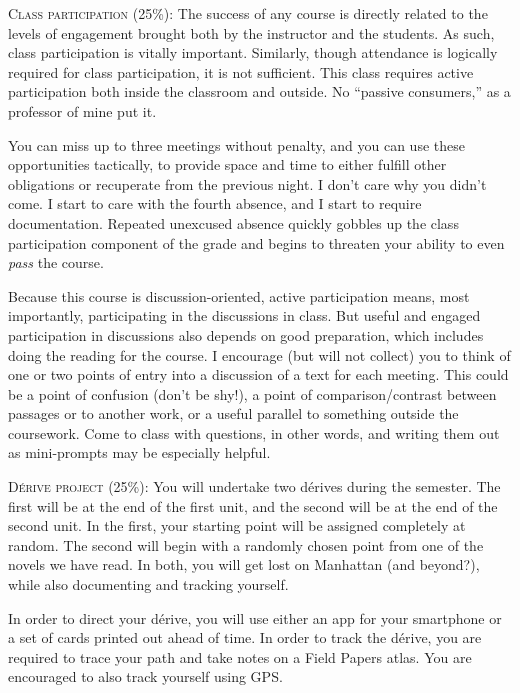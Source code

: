 \begin{description}

  \item \textsc{Class participation (25\%):} The success of any course is
    directly related to the levels of engagement brought both by the instructor
    and the students. As such, class participation is vitally important.
    Similarly, though attendance is logically required for class participation,
    it is not sufficient. This class requires active participation both inside
    the classroom and outside. No “passive consumers,” as a professor of mine
    put it. 
    
    You can miss up to three meetings without penalty, and you can use these
    opportunities tactically, to provide space and time to either fulfill
    other obligations or recuperate from the previous night. I don’t care why
    you didn’t come. I start to care with the fourth absence, and I start to
    require documentation. Repeated unexcused absence quickly gobbles up the
    class participation component of the grade and begins to threaten your
    ability to even \textit{pass} the course.

    Because this course is discussion-oriented, active participation means,
    most importantly, participating in the discussions in class. But useful and
    engaged participation in discussions also depends on good preparation,
    which includes doing the reading for the course. I encourage (but will not
    collect) you to think of one or two points of entry into a discussion of a
    text for each meeting. This could be a point of confusion (don’t be shy!),
    a point of comparison/contrast between passages or to another work, or a
    useful parallel to something outside the coursework. Come to class with
    questions, in other words, and writing them out as mini-prompts may be
    especially helpful.

  \item \textsc{Dérive project (25\%):} You will undertake two dérives during
    the semester. The first will be at the end of the first unit, and the
    second will be at the end of the second unit. In the first, your starting
    point will be assigned completely at random. The second will begin with a
    randomly chosen point from one of the novels we have read. In both, you
    will get lost on Manhattan (and beyond?), while also documenting and
    tracking yourself.
    
    In order to direct your dérive, you will use either an app for your
    smartphone or a set of cards printed out ahead of time. In order to track
    the dérive, you are required to trace your path and take notes on a Field
    Papers atlas. You are encouraged to also track yourself using GPS.


\end{description}
